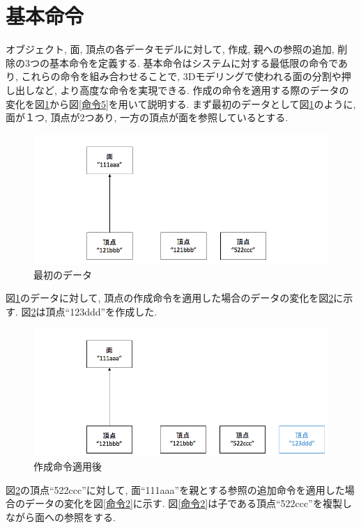\section{基本命令} \label{ope}
オブジェクト, 面, 頂点の各データモデルに対して, 作成, 親への参照の追加, 削除の3つの基本命令を定義する.
基本命令はシステムに対する最低限の命令であり, これらの命令を組み合わせることで, 3Dモデリングで使われる面の分割や押し出しなど, より高度な命令を実現できる.
作成の命令を適用する際のデータの変化を図\ref{命令0}から図\ref{命令5}を用いて説明する.
まず最初のデータとして図\ref{命令0}のように, 面が１つ, 頂点が2つあり, 一方の頂点が面を参照しているとする.
\begin{figure}[]
  \begin{center}
    \includegraphics[scale=0.45]{images/ope0}
    \caption{最初のデータ}
    \label{命令0}
  \end{center}
\end{figure}
図\ref{命令0}のデータに対して, 頂点の作成命令を適用した場合のデータの変化を図\ref{命令1}に示す. 図\ref{命令1}は頂点``123ddd''を作成した.
\begin{figure}[]
  \begin{center}
    \includegraphics[scale=0.45]{images/ope1}
    \caption{作成命令適用後}
    \label{命令1}
  \end{center}
\end{figure}
図\ref{命令1}の頂点``522ccc''に対して, 面``111aaa''を親とする参照の追加命令を適用した場合のデータの変化を図\ref{命令2}に示す. 図\ref{命令2}は子である頂点``522ccc''を複製しながら面への参照をする.
